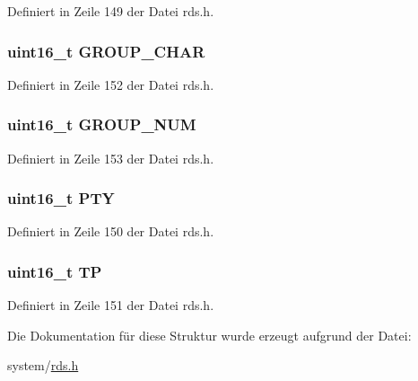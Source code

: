 Definiert in Zeile 149 der Datei rds.\+h.

\hypertarget{structblock__b_a66d4119990dc4c3e040a43885e9bb953}{}
\subsubsection[{G\+R\+O\+U\+P\+\_\+\+C\+H\+A\+R}]{\setlength{\rightskip}{0pt plus 5cm}uint16\+\_\+t G\+R\+O\+U\+P\+\_\+\+C\+H\+A\+R}\label{structblock__b_a66d4119990dc4c3e040a43885e9bb953}


Definiert in Zeile 152 der Datei rds.\+h.

\hypertarget{structblock__b_a9f692e9f76ee88348d426bcd4e9bc70b}{}
\subsubsection[{G\+R\+O\+U\+P\+\_\+\+N\+U\+M}]{\setlength{\rightskip}{0pt plus 5cm}uint16\+\_\+t G\+R\+O\+U\+P\+\_\+\+N\+U\+M}\label{structblock__b_a9f692e9f76ee88348d426bcd4e9bc70b}


Definiert in Zeile 153 der Datei rds.\+h.

\hypertarget{structblock__b_a0474967478fbbc2c71b800d2e0132d45}{}
\subsubsection[{P\+T\+Y}]{\setlength{\rightskip}{0pt plus 5cm}uint16\+\_\+t P\+T\+Y}\label{structblock__b_a0474967478fbbc2c71b800d2e0132d45}


Definiert in Zeile 150 der Datei rds.\+h.

\hypertarget{structblock__b_ab9e634c63b0d95a96716d5f6d7f06d72}{}
\subsubsection[{T\+P}]{\setlength{\rightskip}{0pt plus 5cm}uint16\+\_\+t T\+P}\label{structblock__b_ab9e634c63b0d95a96716d5f6d7f06d72}


Definiert in Zeile 151 der Datei rds.\+h.



Die Dokumentation für diese Struktur wurde erzeugt aufgrund der Datei\+:\begin{DoxyCompactItemize}
\item 
system/\hyperlink{rds_8h}{rds.\+h}\end{DoxyCompactItemize}
